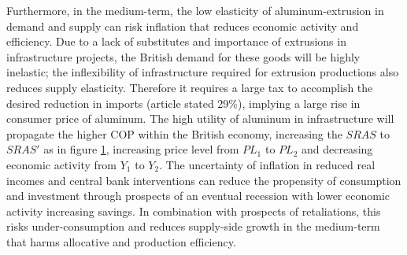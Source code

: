 \documentclass[a4paper,12pt]{article}
\newcommand{\tikzfig}[1]{}
\begin{document}
\begin{figure}[H]
    \centering
    \tikzfig{assets/eco.txt}
    \caption{}
    \label{fig:eco}
\end{figure}
Furthermore, in the medium-term, the low elasticity of aluminum-extrusion in demand and supply can risk inflation that reduces economic activity and efficiency. Due to a lack of substitutes \parencite{statista} and importance of extrusions in infrastructure projects, the British demand for these goods will be highly inelastic; the inflexibility of infrastructure required for extrusion productions also reduces supply elasticity. Therefore it requires a large tax to accomplish the desired reduction in imports (article stated 29\%), implying a large rise in consumer price of aluminum. The high utility of aluminum in infrastructure will propagate the higher COP within the British economy, increasing the $SRAS$ to $SRAS'$ as in figure \ref{fig:eco},
increasing price level from $PL_1$ to $PL_2$ and decreasing economic activity from $Y_1$ to $Y_2$.
The uncertainty of inflation in reduced real incomes and central bank interventions can reduce the propensity of consumption and investment through prospects of an eventual recession with lower economic activity increasing savings. In combination with prospects of retaliations, this risks under-consumption and reduces supply-side growth in the medium-term that harms allocative and production efficiency.




\end{document}
